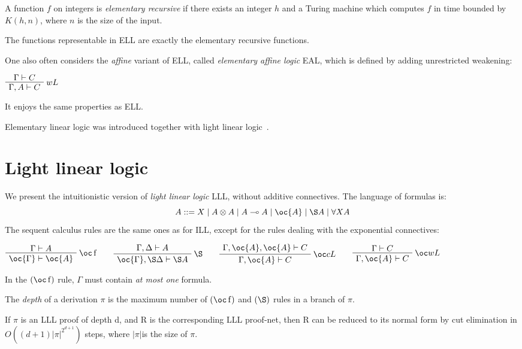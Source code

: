 A function $f$ on integers is \emph{elementary recursive} if there exists
an integer $h$ and a Turing machine which computes $f$ in time bounded by
\(K(h,n)\), where $n$ is the size of the input.

\begin{theorem}
The functions representable in  ELL are exactly the elementary recursive functions.
\end{theorem}

One also often considers the \emph{affine} variant of ELL, called
\emph{elementary affine logic} EAL, which is defined by adding
unrestricted weakening:

\(\AxRule{\Gamma\vdash C}
\LabelRule{ w L}
\UnaRule{\Gamma,A\vdash C}
\DisplayProof\)

It enjoys the same properties as ELL.

Elementary linear logic was introduced together with light linear logic~\cite{lightlinearlogic}.

\section{Light linear logic}\label{light-linear-logic}

We present the intuitionistic version of \emph{light linear logic} LLL,
without additive connectives. The language of formulas is:
\begin{equation*}
A ::= X \mid A\tens A \mid A\limp A  \mid \oc{A} \mid \pg{A} \mid \forall X A
\end{equation*}
The sequent calculus rules are the same ones as for ILL, except for the
rules dealing with the exponential connectives:

\(\AxRule{\Gamma\vdash A}
\LabelRule{\oc\rulename{f} }
\UnaRule{\oc{\Gamma}\vdash\oc{A}}
\DisplayProof
\qquad
\AxRule{\Gamma, \Delta\vdash A}
\LabelRule{\pg }
\UnaRule{\oc{\Gamma}, \pg \Delta\vdash\pg{A}}
\DisplayProof
\qquad
\AxRule{\Gamma,\oc{A},\oc{A}\vdash C}
\LabelRule{\oc c L}
\UnaRule{\Gamma,\oc{A}\vdash C}
\DisplayProof
\qquad
\AxRule{\Gamma\vdash C}
\LabelRule{\oc w L}
\UnaRule{\Gamma,\oc{A}\vdash C}
\DisplayProof\)

In the \((\oc\rulename{f})\) rule, \(\Gamma\) must contain \emph{at most
one} formula.

The \emph{depth} of a derivation \(\pi\) is the maximum number of
\((\oc\rulename{f})\) and \((\pg)\) rules in a branch of \(\pi\).

\begin{theorem}
If $\pi$ is an LLL proof of depth d, and R is the corresponding LLL proof-net, then R can be reduced to its normal form by cut elimination in  $ O((d+1)|\pi|^{2^{d+1}})$ steps, where $|\pi|$is the size of $\pi$.
\end{theorem}

